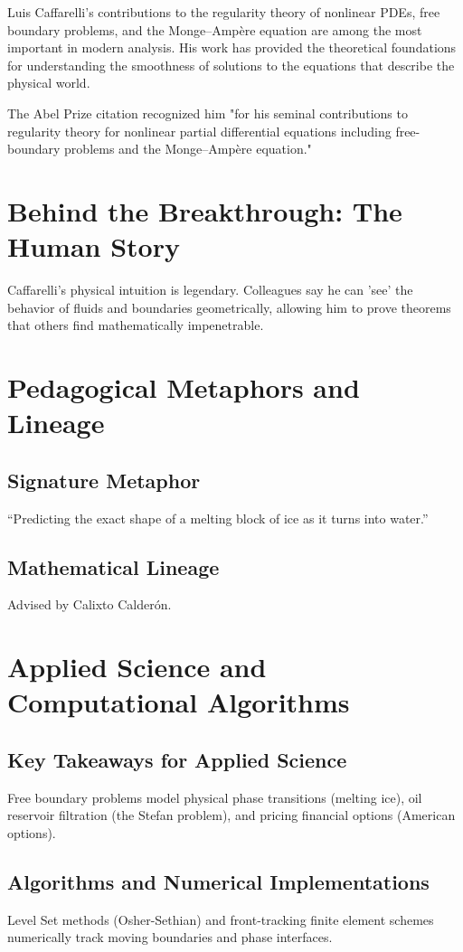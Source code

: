 Luis Caffarelli's contributions to the regularity theory of nonlinear PDEs, free boundary problems, and the Monge--Amp\`ere equation are among the most important in modern analysis. His work has provided the theoretical foundations for understanding the smoothness of solutions to the equations that describe the physical world.

The Abel Prize citation recognized him "for his seminal contributions to regularity theory for nonlinear partial differential equations including free-boundary problems and the Monge--Amp\`ere equation."


\section{Behind the Breakthrough: The Human Story}
Caffarelli's physical intuition is legendary. Colleagues say he can 'see' the behavior of fluids and boundaries geometrically, allowing him to prove theorems that others find mathematically impenetrable.

\section{Pedagogical Metaphors and Lineage}
\subsection{Signature Metaphor}
``Predicting the exact shape of a melting block of ice as it turns into water.''

\subsection{Mathematical Lineage}
Advised by Calixto Calder\'on.

\section{Applied Science and Computational Algorithms}
\subsection{Key Takeaways for Applied Science}
Free boundary problems model physical phase transitions (melting ice), oil reservoir filtration (the Stefan problem), and pricing financial options (American options).

\subsection{Algorithms and Numerical Implementations}
Level Set methods (Osher-Sethian) and front-tracking finite element schemes numerically track moving boundaries and phase interfaces.

